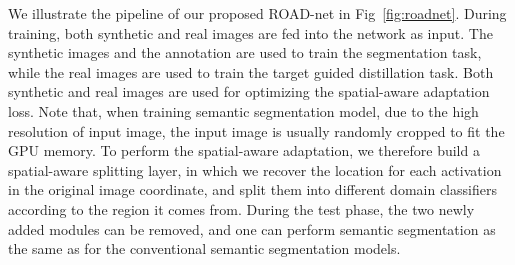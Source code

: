 \documentclass[10pt,twocolumn,letterpaper]{article}
\begin{document}
We illustrate the pipeline of our proposed ROAD-net in Fig~\ref{fig:roadnet}. During training, both synthetic and real images are fed into the network as input. The synthetic images and the annotation are used to train the segmentation task, while the real images are used to train the target guided distillation task. Both synthetic and real images are used for optimizing the spatial-aware adaptation loss. Note that, when training semantic segmentation model, due to the high resolution of input image, the input image is usually randomly cropped to fit the GPU memory. To perform the spatial-aware adaptation, we therefore build a spatial-aware splitting layer, in which we recover the location for each activation in the original image coordinate, and split them into different domain classifiers according to the region it comes from. During the test phase, the two newly added modules can be removed, and one can perform semantic segmentation as the same as for the conventional semantic segmentation models.
\end{document}
